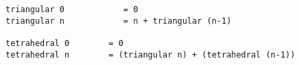 \fontsize{8pt}{10pt}
\begin{verbatim}
triangular 0            = 0
triangular n            = n + triangular (n-1)

tetrahedral 0        = 0
tetrahedral n        = (triangular n) + (tetrahedral (n-1))
\end{verbatim}